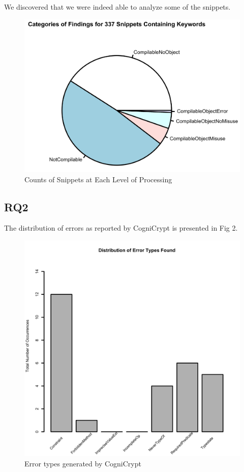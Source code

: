 \documentclass[10pt, conference]{IEEEtran}
\begin{document}
We discovered that we were indeed able to analyze some of the snippets. 
\begin{figure}[h]
\begin{center}
\includegraphics[width=.75\linewidth]{Pie.png}
\caption{Counts of Snippets at Each Level of Processing}
\end{center}
\end{figure}

\subsection{RQ2}

The distribution of errors as reported by CogniCrypt is presented in Fig 2.

\begin{figure}[h]
\begin{center}
\includegraphics[width=.9\linewidth]{Dist.png}
\caption{Error types generated by CogniCrypt}
\end{center}
\end{figure}
\end{document}
